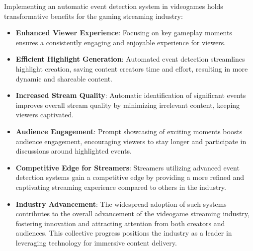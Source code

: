 Implementing an automatic event detection system in videogames holds transformative benefits for the gaming streaming industry:

\begin{itemize}
    \item \textbf{Enhanced Viewer Experience}: Focusing on key gameplay moments ensures a consistently engaging and enjoyable experience for viewers.
    \item \textbf{Efficient Highlight Generation}: Automated event detection streamlines highlight creation, saving content creators time and effort, resulting in more dynamic and shareable content.
    \item \textbf{Increased Stream Quality}: Automatic identification of significant events improves overall stream quality by minimizing irrelevant content, keeping viewers captivated.
    \item \textbf{Audience Engagement}: Prompt showcasing of exciting moments boosts audience engagement, encouraging viewers to stay longer and participate in discussions around highlighted events.
    \item \textbf{Competitive Edge for Streamers}: Streamers utilizing advanced event detection systems gain a competitive edge by providing a more refined and captivating streaming experience compared to others in the industry.
    \item \textbf{Industry Advancement}: The widespread adoption of such systems contributes to the overall advancement of the videogame streaming industry, fostering innovation and attracting attention from both creators and audiences. This collective progress positions the industry as a leader in leveraging technology for immersive content delivery.
\end{itemize}




